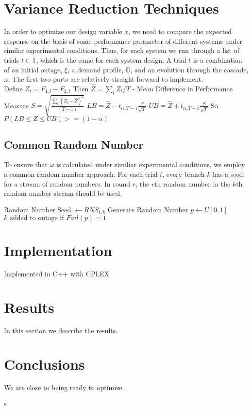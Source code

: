 \section{Variance Reduction Techniques}\label{var}
In order to optimize our design variable $x$, we need to compare the expected response on the basis of some performance parameter of different systems under similar experimental conditions.  Thus, for each system we run through a list of trials $t \in \mathbb{T}$, which is the same for each system design.  A trial $t$ is a combination of an initial outage, $\xi$, a demand profile, $\mathbb{D}$, and an evolution through the cascade, $\omega$.  The first two parts are relatively straight forward to implement. \\
\newline
Define $Z_t = F_{1,l} - F_{2,t} $\newline
Then $\hat{Z} = \sum_t Z_t / T $ - Mean Difference in Performance Measure \newline
$ S = \sqrt{ \frac{\sum_t  \left( Z_t - \hat{Z} \right)^2 }{  \left( T-1 \right)  }} $ \newline
$ LB = \hat{Z} - t_{\alpha,T-1} \frac{S}{\sqrt{T}} $ \newline
$ UB = \hat{Z} + t_{\alpha,T-1} \frac{S}{\sqrt{T}} $ \newline
So\newline
$ P ( LB \leq Z \leq UB ) >= (1-\alpha) $
\subsection{Common Random Number}\label{crn}
 To ensure that $\omega$ is calculated under similiar experimental conditions, we employ a common random number approach.  For each trial $t$, every branch $k$ has a seed for a stream of random numbers.  In round $r$, the $r$th random number in the $k$th random number stream should be used.\\
 \begin{algorithmic}
 					\STATE Random Number Seed $ \gets RNS_{t,k} $
 							\STATE Generate Random Number
 					\ENDFOR
 					\STATE $p \gets U \left[ 0, 1\right] $
 					\STATE ${k} \mbox{ added to outage if } Fail(p) = 1 $
 		\ENDIF
 \ENDFOR
 \end{algorithmic}
\section{Implementation}\label{imp}
Implemented in C++ with CPLEX

\section{Results}\label{results}
In this section we describe the results.

\section{Conclusions}\label{conclusions}
We are close to being ready to optimize...

s
